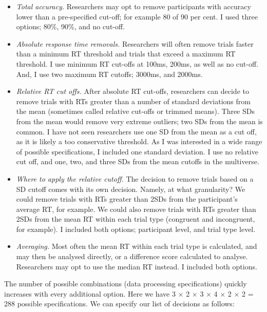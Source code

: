 \documentclass[
  english,
  man,floatsintext]{apa6}
\begin{document}
\begin{itemize}
\item
  \emph{Total accuracy.} Researchers may opt to remove participants with accuracy lower than a pre-specified cut-off; for example 80 of 90 per cent. I used three options; 80\%, 90\%, and no cut-off.
\item
  \emph{Absolute response time removals.} Researchers will often remove trials faster than a minimum RT threshold and trials that exceed a maximum RT threshold. I use minimum RT cut-offs at 100ms, 200ms, as well as no cut-off. And, I use two maximum RT cutoffs; 3000ms, and 2000ms.
\item
  \emph{Relative RT cut offs.} After absolute RT cut-offs, researchers can decide to remove trials with RTs greater than a number of standard deviations from the mean (sometimes called relative cut-offs or trimmed means). Three SDs from the mean would remove very extreme outliers; two SDs from the mean is common. I have not seen researchers use one SD from the mean as a cut off, as it is likely a too conservative threshold. As I was interested in a wide range of possible specifications, I included one standard deviation. I use no relative cut off, and one, two, and three SDs from the mean cutoffs in the multiverse.
\item
  \emph{Where to apply the relative cutoff.} The decision to remove trials based on a SD cutoff comes with its own decision. Namely, at what granularity? We could remove trials with RTs greater than 2SDs from the participant's average RT, for example. We could also remove trials with RTs greater than 2SDs from the mean RT within each trial type (congruent and incongruent, for example). I included both options; participant level, and trial type level.
\item
  \emph{Averaging.} Most often the mean RT within each trial type is calculated, and may then be analysed directly, or a difference score calculated to analyse. Researchers may opt to use the median RT instead. I included both options.
\end{itemize}

The number of possible combinations (data processing specifications) quickly increases with every additional option. Here we have 3 \(\times\) 2 \(\times\) 3 \(\times\) 4 \(\times\) 2 \(\times\) 2 = 288 possible specifications. We can specify our list of decisions as follows:
\end{document}
